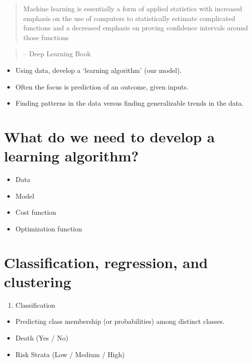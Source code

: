 \documentclass[fontset=fandol,zihao=false,scheme=chinese,heading=true,UTF8]{ctexbook}
\providecommand{\tightlist}{%
  \setlength{\itemsep}{0pt}\setlength{\parskip}{0pt}}
\begin{document}
\begin{quote}
Machine learning is essentially a form of applied statistics with increased emphasis on the use of computers to statistically estimate complicated functions and a decreased emphasis on proving confidence intervals around those functions
\end{quote}

\begin{quote}
-- Deep Learning Book
\end{quote}

\begin{itemize}
\tightlist
\item
  Using data, develop a `learning algorithm' (our model).
\item
  Often the focus is prediction of an outcome, given inputs.
\item
  Finding patterns in the data versus finding generalizable trends in the data.
\end{itemize}

\hypertarget{what-do-we-need-to-develop-a-learning-algorithm}{%
\section{What do we need to develop a learning algorithm?}\label{what-do-we-need-to-develop-a-learning-algorithm}}

\begin{itemize}
\tightlist
\item
  Data
\item
  Model
\item
  Cost function
\item
  Optimization function
\end{itemize}

\hypertarget{classification-regression-and-clustering}{%
\section{Classification, regression, and clustering}\label{classification-regression-and-clustering}}

\begin{enumerate}
\def\labelenumi{\arabic{enumi}.}
\tightlist
\item
  Classification
\end{enumerate}

\begin{itemize}
\tightlist
\item
  Predicting class membership (or probabilities) among distinct classes.
\item
  Death (Yes / No)
\item
  Risk Strata (Low / Medium / High)
\end{itemize}
\end{document}
